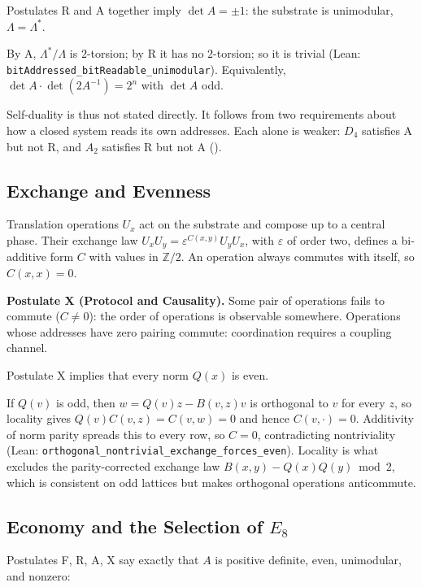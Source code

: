 \begin{theorem}
Postulates R and A together imply $\det A=\pm1$: the substrate is unimodular, $\Lambda=\Lambda^*$.
\end{theorem}
By A, $\Lambda^*/\Lambda$ is $2$-torsion; by R it has no $2$-torsion; so it is trivial (Lean: \texttt{bitAddressed\_bitReadable\_unimodular}). Equivalently, $\det A\cdot\det(2A^{-1})=2^n$ with $\det A$ odd.

Self-duality is thus not stated directly. It follows from two requirements about how a closed system reads its own addresses. Each alone is weaker: $D_4$ satisfies A but not R, and $A_2$ satisfies R but not A ().

\subsection{Exchange and Evenness}
\label{sec:even}
Translation operations $U_x$ act on the substrate and compose up to a central phase. Their exchange law $U_xU_y=\varepsilon^{C(x,y)}U_yU_x$, with $\varepsilon$ of order two, defines a bi-additive form $C$ with values in $\mathbb Z/2$. An operation always commutes with itself, so $C(x,x)=0$.

\textbf{Postulate X (Protocol and Causality).} Some pair of operations fails to commute ($C\neq0$): the order of operations is observable somewhere. Operations whose addresses have zero pairing commute: coordination requires a coupling channel.

\begin{theorem}
Postulate X implies that every norm $Q(x)$ is even.
\end{theorem}
If $Q(v)$ is odd, then $w=Q(v)z-B(v,z)v$ is orthogonal to $v$ for every $z$, so locality gives $Q(v)C(v,z)=C(v,w)=0$ and hence $C(v,\cdot)=0$. Additivity of norm parity spreads this to every row, so $C=0$, contradicting nontriviality (Lean: \texttt{orthogonal\_nontrivial\_exchange\_forces\_even}). Locality is what excludes the parity-corrected exchange law $B(x,y)-Q(x)Q(y)\bmod2$, which is consistent on odd lattices but makes orthogonal operations anticommute.

\subsection{Economy and the Selection of \texorpdfstring{$E_8$}{E8}}
\label{sec:lattice_selection}
Postulates F, R, A, X say exactly that $A$ is positive definite, even, unimodular, and nonzero:

